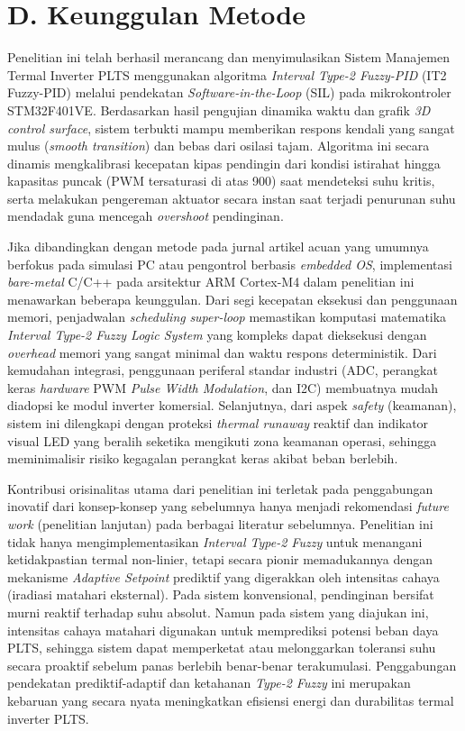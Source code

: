 \documentclass[11pt,a4paper]{article}
\begin{document}
\newpage
\section*{D. Keunggulan Metode}

Penelitian ini telah berhasil merancang dan menyimulasikan Sistem Manajemen Termal Inverter PLTS menggunakan algoritma \textit{Interval Type-2 Fuzzy-PID} (IT2 Fuzzy-PID) melalui pendekatan \textit{Software-in-the-Loop} (SIL) pada mikrokontroler STM32F401VE. Berdasarkan hasil pengujian dinamika waktu dan grafik \textit{3D control surface}, sistem terbukti mampu memberikan respons kendali yang sangat mulus (\textit{smooth transition}) dan bebas dari osilasi tajam. Algoritma ini secara dinamis mengkalibrasi kecepatan kipas pendingin dari kondisi istirahat hingga kapasitas puncak (PWM tersaturasi di atas 900) saat mendeteksi suhu kritis, serta melakukan pengereman aktuator secara instan saat terjadi penurunan suhu mendadak guna mencegah \textit{overshoot} pendinginan.

Jika dibandingkan dengan metode pada jurnal artikel acuan yang umumnya berfokus pada simulasi PC atau pengontrol berbasis \textit{embedded OS}, implementasi \textit{bare-metal} C/C++ pada arsitektur ARM Cortex-M4 dalam penelitian ini menawarkan beberapa keunggulan. Dari segi kecepatan eksekusi dan penggunaan memori, penjadwalan \textit{scheduling} \textit{super-loop} memastikan komputasi matematika \textit{Interval Type-2 Fuzzy Logic System} yang kompleks dapat dieksekusi dengan \textit{overhead} memori yang sangat minimal dan waktu respons deterministik. Dari kemudahan integrasi, penggunaan periferal standar industri (ADC, perangkat keras \textit{hardware} PWM \textit{Pulse Width Modulation}, dan I2C) membuatnya mudah diadopsi ke modul inverter komersial. Selanjutnya, dari aspek \textit{safety} (keamanan), sistem ini dilengkapi dengan proteksi \textit{thermal runaway} reaktif dan indikator visual LED yang beralih seketika mengikuti zona keamanan operasi, sehingga meminimalisir risiko kegagalan perangkat keras akibat beban berlebih.

Kontribusi orisinalitas utama dari penelitian ini terletak pada penggabungan inovatif dari konsep-konsep yang sebelumnya hanya menjadi rekomendasi \textit{future work} (penelitian lanjutan) pada berbagai literatur sebelumnya. Penelitian ini tidak hanya mengimplementasikan \textit{Interval Type-2 Fuzzy} untuk menangani ketidakpastian termal non-linier, tetapi secara pionir memadukannya dengan mekanisme \textit{Adaptive Setpoint} prediktif yang digerakkan oleh intensitas cahaya (iradiasi matahari eksternal). Pada sistem konvensional, pendinginan bersifat murni reaktif terhadap suhu absolut. Namun pada sistem yang diajukan ini, intensitas cahaya matahari digunakan untuk memprediksi potensi beban daya PLTS, sehingga sistem dapat memperketat atau melonggarkan toleransi suhu secara proaktif sebelum panas berlebih benar-benar terakumulasi. Penggabungan pendekatan prediktif-adaptif dan ketahanan \textit{Type-2 Fuzzy} ini merupakan kebaruan yang secara nyata meningkatkan efisiensi energi dan durabilitas termal inverter PLTS.
\end{document}
